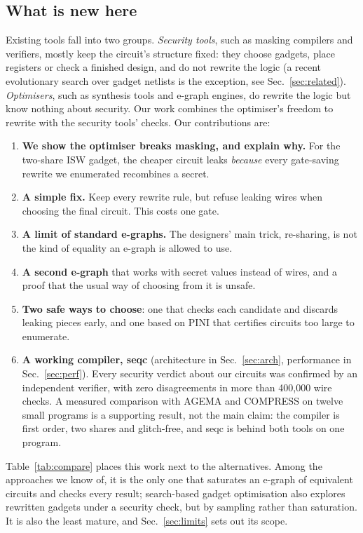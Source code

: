 \documentclass[conference]{IEEEtran}
\begin{document}
\subsection{What is new here}
Existing tools fall into two groups. \emph{Security tools}, such as masking compilers and verifiers, mostly keep the circuit's structure fixed: they choose gadgets, place registers or check a finished design, and do not rewrite the logic (a recent evolutionary search over gadget netlists is the exception, see Sec.~\ref{sec:related}). \emph{Optimisers}, such as synthesis tools and e-graph engines, do rewrite the logic but know nothing about security. Our work combines the optimiser's freedom to rewrite with the security tools' checks. Our contributions are:
\begin{enumerate}
\item \textbf{We show the optimiser breaks masking, and explain why.} For the two-share ISW gadget, the cheaper circuit leaks \emph{because} every gate-saving rewrite we enumerated recombines a secret.
\item \textbf{A simple fix.} Keep every rewrite rule, but refuse leaking wires when choosing the final circuit. This costs one gate.
\item \textbf{A limit of standard e-graphs.} The designers' main trick, re-sharing, is not the kind of equality an e-graph is allowed to use.
\item \textbf{A second e-graph} that works with secret values instead of wires, and a proof that the usual way of choosing from it is unsafe.
\item \textbf{Two safe ways to choose}: one that checks each candidate and discards leaking pieces early, and one based on PINI that certifies circuits too large to enumerate.
\item \textbf{A working compiler, seqc} (architecture in Sec.~\ref{sec:arch}, performance in Sec.~\ref{sec:perf}). Every security verdict about our circuits was confirmed by an independent verifier, with zero disagreements in more than 400,000 wire checks. A measured comparison with AGEMA and COMPRESS on twelve small programs is a supporting result, not the main claim: the compiler is first order, two shares and glitch-free, and seqc is behind both tools on one program.
\end{enumerate}
Table~\ref{tab:compare} places this work next to the alternatives. Among the approaches we know of, it is the only one that saturates an e-graph of equivalent circuits and checks every result; search-based gadget optimisation \cite{koblah2025evo} also explores rewritten gadgets under a security check, but by sampling rather than saturation. It is also the least mature, and Sec.~\ref{sec:limits} sets out its scope.
\end{document}
